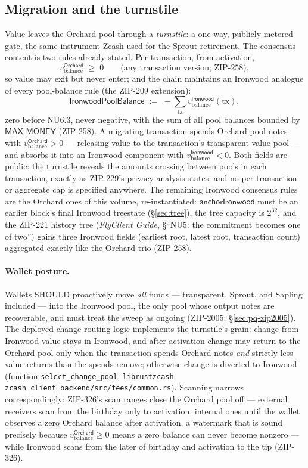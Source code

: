 \documentclass[11pt,a4paper]{article}
\theoremstyle{definition}
\begin{document}
\subsection{Migration and the turnstile}\label{sec:iw-turnstile}

Value leaves the Orchard pool through a \emph{turnstile}: a one-way,
publicly metered gate, the same instrument Zcash used for the Sprout
retirement. The consensus content is two rules already stated. Per
transaction, from activation,
\[
v_{\mathrm{balance}}^{\mathsf{Orchard}} \;\ge\; 0
\qquad \text{(any transaction version; ZIP-258)},
\]
so value may exit but never enter; and the chain maintains an Ironwood
analogue of every pool-balance rule (the ZIP-209 extension):
\[
\mathsf{IronwoodPoolBalance} \;:=\; -\sum_{\mathrm{tx}}
v_{\mathrm{balance}}^{\mathsf{Ironwood}}(\mathrm{tx}),
\]
zero before NU6.3, never negative, with the sum of all pool balances
bounded by $\mathsf{MAX\_MONEY}$ (ZIP-258). A migrating transaction spends
Orchard-pool notes with $v_{\mathrm{balance}}^{\mathsf{Orchard}} > 0$ ---
releasing value to the transaction's transparent value pool --- and absorbs
it into an Ironwood component with
$v_{\mathrm{balance}}^{\mathsf{Ironwood}} < 0$. Both fields are public: the
turnstile reveals the amounts crossing between pools in each transaction,
exactly as ZIP-229's privacy analysis states, and no per-transaction or
aggregate cap is specified anywhere. The remaining Ironwood consensus rules
are the Orchard ones of this volume, re-instantiated:
$\mathsf{anchorIronwood}$ must be an earlier block's final Ironwood
treestate (\S\ref{sec:tree}), the tree capacity is $2^{32}$, and the ZIP-221
history tree (\emph{FlyClient Guide}, \S``NU5: the commitment becomes one
of two'') gains three Ironwood fields (earliest root, latest root,
transaction count) aggregated exactly like the Orchard trio (ZIP-258).

\paragraph{Wallet posture.} Wallets SHOULD proactively move \emph{all}
funds --- transparent, Sprout, and Sapling included --- into the Ironwood
pool, the only pool whose output notes are recoverable, and must treat the
sweep as ongoing (ZIP-2005; \S\ref{sec:pq-zip2005}). The deployed change-routing
logic implements the turnstile's grain: change from Ironwood value stays in
Ironwood, and after activation change may return to the Orchard pool only
when the transaction spends Orchard notes \emph{and} strictly less value
returns than the spends remove; otherwise change is diverted to Ironwood
(function \texttt{select\_change\_pool}, \texttt{librustzcash
zcash\_client\_backend/src/fees/common.rs}). Scanning narrows
correspondingly: ZIP-326's scan ranges close the Orchard pool off ---
external receivers scan from the birthday only to activation, internal ones
until the wallet observes a zero Orchard balance after activation, a
watermark that is sound precisely because
$v_{\mathrm{balance}}^{\mathsf{Orchard}} \ge 0$ means a zero balance can
never become nonzero --- while Ironwood scans from the later of birthday
and activation to the tip (ZIP-326).
\end{document}
